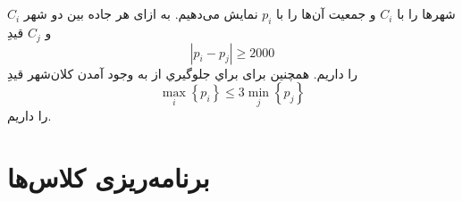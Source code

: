 \documentclass{article}
\begin{document}
\subsection{}
شهرها را با $C_{i}$ و جمعیت آن‌ها را با $p_{i}$ نمایش می‌دهیم. به ازای هر جاده بین دو شهر $C_{i}$ و $C_{j}$ قیدِ
\begin{equation}
\left| p_{i} - p_{j} \right| \ge 2000
\end{equation}
را داریم. همچنین برای براي جلوگيري از به وجود آمدن كلان‌شهر قیدِ
\begin{equation}
\max_{i}\left\{ p_{i} \right\} \le 3\min_{j}\left\{ p_{j} \right\}
\end{equation}
را داریم.

\subsection{}








\section{برنامه‌ریزی کلاس‌ها}
\end{document}
